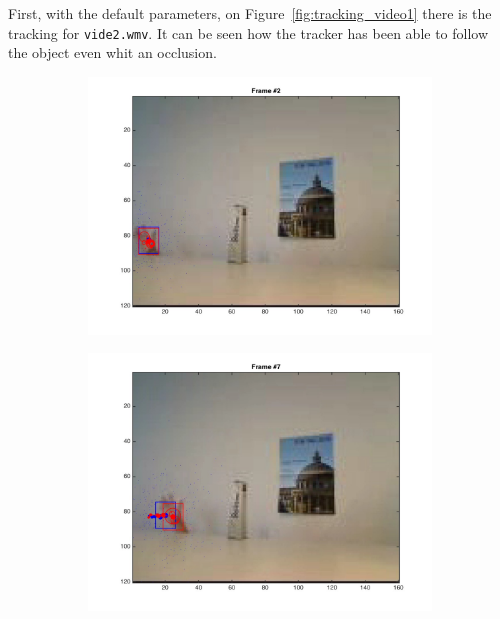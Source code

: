 \documentclass{ethz_report}
\begin{document}
First, with the default parameters, on Figure~\ref{fig:tracking_video1} there is the tracking for \texttt{vide2.wmv}. It can be seen how the tracker has been able to follow the object even whit an occlusion.

\begin{figure}[h]
    \centering
    \begin{subfigure}[b]{.25\textwidth}
        \centering
        \includegraphics[width=1\linewidth]{images/video2__1}
    \end{subfigure}%
    \begin{subfigure}[b]{.25\textwidth}
        \centering
        \includegraphics[width=1\linewidth]{images/video2__6}
    \end{subfigure}%

\end{figure}
\end{document}
